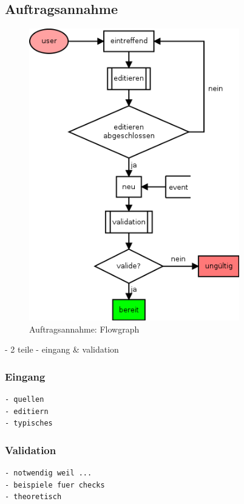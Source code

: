 \subsection{Auftragsannahme}


\begin{figure}[ht]
  \centering
  \label{fig:lebenszyklus-auftrag-eingang}
  \includegraphics[height=5in]{imageinput/lebenszyklus-auftrag-eingang.png}
  \caption{Auftragsannahme: Flowgraph}
\end{figure}

- 2 teile
- eingang \& validation


\subsubsection{Eingang}

\begin{verbatim}
- quellen
- editiern
- typisches
\end{verbatim}

\subsubsection{Validation}
\begin{verbatim}
- notwendig weil ...
- beispiele fuer checks
- theoretisch
\end{verbatim}


